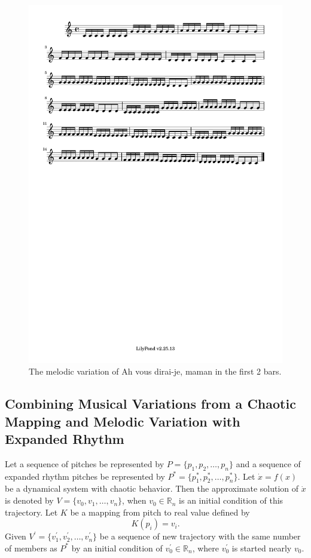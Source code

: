 \documentclass[11pt]{article}
\begin{document}
\begin{figure}
\centering
\includegraphics[trim=1cm 26.5cm 1cm 0.5cm, clip, scale=0.6]{melody_variation.pdf}
\caption{The melodic variation of Ah vous dirai-je, maman in the first 2 bars.}
\label{fig:MV2}
\end{figure}

\subsection{Combining Musical Variations from a Chaotic Mapping and Melodic Variation with Expanded Rhythm}
Let a sequence of pitches be represented by $P = \{p_1, p_2, \dots, p_n\}$ and a sequence of expanded rhythm pitches be represented by $P^* = \{p^*_1, p^*_2, \dots, p^*_n\}$. Let $\dot{x} = f(x)$ be a dynamical system with chaotic behavior. Then the approximate solution of $\dot{x}$ is denoted by $V = \{v_0, v_1, \dots, v_n\}$, when $v_0 \in \mathbb{R}_n$ is an initial condition of this trajectory. Let $K$ be a mapping from pitch to real value defined by 
$$K(p_i) = v_i.$$ 
Given $V^\prime = \{ v^\prime_1, v^\prime_2, \dots, v^\prime_n \}$ be a sequence of new trajectory with the same number of members as $P^*$ by an initial condition of $v^\prime_0 \in \mathbb{R}_n$, where $v^\prime_0$ is started nearly $v_0$.
\end{document}
